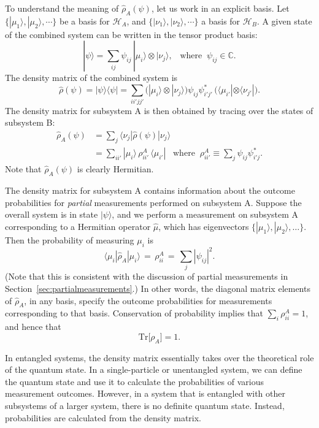 \documentclass[pra,11pt]{revtex4}
\begin{document}
To understand the meaning of $\hat{\rho}_A(\psi)$, let us work in
an explicit basis.  Let $\{|\mu_1\rangle, |\mu_2\rangle,\cdots\}$ be a
basis for $\mathscr{H}_A$, and $\{|\nu_1\rangle,
|\nu_2\rangle,\cdots\}$ a basis for $\mathscr{H}_B$.  A given state of
the combined system can be written in the tensor product basis:
$$|\psi\rangle = \sum_{ij} \psi_{ij} \, |\mu_i\rangle \otimes |\nu_j\rangle, \;\;\; \mathrm{where}\;\; \psi_{ij} \in \mathbb{C}.$$
The density matrix of the combined system is
$$\hat{\rho}(\psi) = |\psi\rangle \langle\psi| = \sum_{ii'jj'} \Big( |\mu_i\rangle \otimes |\nu_j\rangle\Big) \psi_{ij} \psi_{i'j'}^* \, \Big(\langle \mu_{i'}| \otimes \langle \nu_{j'}|\Big).$$
The density matrix for subsystem A is then obtained by tracing over
the states of subsystem B:
$$\begin{aligned}\hat{\rho}_A(\psi) &= \sum_j \langle \nu_j | \hat{\rho}(\psi) | \nu_j \rangle \\ &= \sum_{ii'} |\mu_i\rangle \,\rho_{ii'}^A \, \langle \mu_{i'}| \;\;\;\mathrm{where} \;\; \rho_{ii'}^A \equiv \sum_j \psi_{ij} \psi_{i'j}^*.\end{aligned}$$
Note that $\hat{\rho}_A(\psi)$ is clearly Hermitian.

The density matrix for subsystem A contains information about the
outcome probabilities for \textit{partial} measurements performed on
subsystem A.  Suppose the overall system is in state $|\psi\rangle$,
and we perform a measurement on subsystem A corresponding to a
Hermitian operator $\hat{\mu}$, which has eigenvectors
$\{|\mu_1\rangle,|\mu_2\rangle,\dots\}$.  Then the probability of
measuring $\mu_i$ is
$$\langle \mu_i | \hat{\rho}_A |\mu_i \rangle \,=\, \rho_{ii}^A \,=\, \sum_{j} |\psi_{ij}|^2.$$
(Note that this is consistent with the discussion of partial
measurements in Section~\ref{sec:partialmeasurements}.)  In other
words, the diagonal matrix elements of $\hat{\rho}_A$, in any basis,
specify the outcome probabilities for measurements corresponding to
that basis.  Conservation of probability implies that $\sum_i
\rho^A_{ii} = 1$, and hence that
$$\mathrm{Tr}\big[\rho_A\big] = 1.$$

In entangled systems, the density matrix essentially takes over the
theoretical role of the quantum state.  In a single-particle or
unentangled system, we can define the quantum state and use it to
calculate the probabilities of various measurement outcomes.  However,
in a system that is entangled with other subsystems of a larger
system, there is no definite quantum state.  Instead, probabilities
are calculated from the density matrix.
\end{document}

